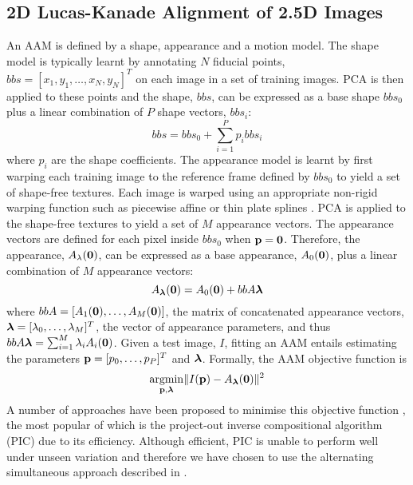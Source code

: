 \subsection{2D Lucas-Kanade Alignment of 2.5D Images}\label{subsec:singl_img_lk_2d}
An AAM is defined by a shape, appearance and a motion model. The shape model is
typically learnt by annotating $N$ fiducial points, $bb{s} = [x_1, y_1,
\ldots, x_N, y_N]^T$ on each image in a set of training images. PCA is then
applied to these points and the shape, $bb{s}$, can be expressed as a
base shape $bb{s}_0$ plus a linear combination of $P$ shape vectors,
$bb{s}_i$:
\begin{equation}\label{eq:aam-shape-model}
    bb{s} = bb{s}_0 + \sum^P_{i=1} p_i bb{s}_i
\end{equation}
where $p_i$ are the shape coefficients. The appearance model is learnt by first
warping each training image to the reference frame defined by $bb{s}_0$
to yield a set of shape-free textures. Each image is warped using an appropriate
non-rigid warping function such as piecewise affine \cite{cootes2001active} or thin
plate splines \cite{papandreou2008adaptive}. PCA is applied to the shape-free textures to
yield a set of $M$ appearance vectors. The appearance vectors are defined for
each pixel inside $bb{s}_0$ when $\boldsymbol{\mathbf{p}} = \boldsymbol{\mathbf{0}}$. Therefore, the
appearance, $A_\lambda(\boldsymbol{\mathbf{0}})$, can be expressed as a base appearance,
$A_0(\boldsymbol{\mathbf{0}})$, plus a linear combination of $M$ appearance vectors:
\begin{equation}\label{eq:aam-appearance-model}
    A_{\boldsymbol{\mathbf{\lambda}}}(\boldsymbol{\mathbf{0}}) = A_0(\boldsymbol{\mathbf{0}}) + bb{A} \boldsymbol{\mathbf{\lambda}}
\end{equation}
where $bb{A} = [A_1(\boldsymbol{\mathbf{0}}), \ldots, A_M(\boldsymbol{\mathbf{0}})]$, the matrix of
concatenated appearance vectors, $\boldsymbol{\mathbf{\lambda}} = [\lambda_0, \ldots, \lambda_M]^T$,
the vector of appearance parameters, and thus $bb{A} \boldsymbol{\mathbf{\lambda}} =
\sum^M_{i=1} \lambda_i A_i(\boldsymbol{\mathbf{0}})$. Given a test image, $I$, fitting an AAM
entails estimating the parameters $\boldsymbol{\mathbf{p}} = [p_0, \ldots, p_P]^T$ and $\boldsymbol{\mathbf{\lambda}}$.
Formally, the AAM objective function is
\begin{equation}\label{eq:aam-objective}
    \argmin_{\p,\blambda} \norm{I(\p) - A_{\blambda}(\zero)}^2
\end{equation}
A number of approaches have been proposed to minimise this objective function
\cite{gross2005generic,matthews2004active,papandreou2008adaptive}, the most popular of
which is the project-out inverse compositional algorithm (PIC)
\cite{cootes2001active,amberg2009compositional} due to its efficiency. Although efficient, PIC
is unable to perform well under unseen variation and therefore we have chosen to
use the alternating simultaneous approach described in \cite{matthews2004active}.
